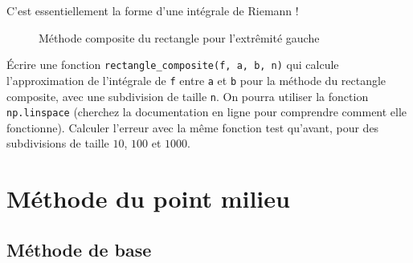 C'est essentiellement la forme d'une intégrale de Riemann !

\begin{figure}[h!]
    \centering

    \caption{Méthode composite du rectangle pour l'extrêmité gauche}
    \label{fig:rectangle-composite-method}
\end{figure}

\quessques Écrire une fonction \texttt{rectangle\_composite(f, a, b, n)} qui calcule l'approximation de l'intégrale de \texttt{f} entre \texttt{a} et \texttt{b} pour la méthode du rectangle composite, avec une subdivision de taille \texttt{n}. On pourra utiliser la fonction \texttt{np.linspace} (cherchez la documentation en ligne pour comprendre comment elle fonctionne).
\ssques Calculer l'erreur avec la même fonction test qu'avant, pour des subdivisions de taille $ 10 $, $ 100 $ et $ 1000 $.


\section{Méthode du point milieu}
\subsection{Méthode de base}

